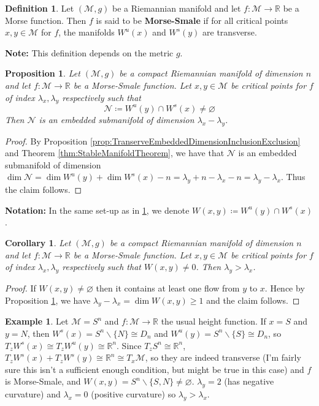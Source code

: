 \documentclass[10pt]{article}
\theoremstyle{plain}
\newtheorem{corollary}[thm]{Corollary}
\newtheorem{prop}[thm]{Proposition}
\theoremstyle{definition}
\newtheorem{defn}[thm]{Definition} %
\newtheorem{exmp}[thm]{Example} %
\newcommand{\Notation}{\textbf{Notation: }}
\newcommand{\Note}{\textbf{Note: }}
\newcommand{\Real}{\mathbb{R}}
\newcommand{\man}{\mathcal{M}}
\newcommand{\nan}{\mathcal{N}}
\begin{document}
\begin{defn}
    Let $(\man,g)$ be a Riemannian manifold and let $f:\man\to\Real$ be a Morse function. Then $f$ is said to be \textbf{Morse-Smale} if for all critical points $x,y\in\man$ for $f$, the manifolds $W^u(x)$ and $W^s(y)$ are transverse.
\end{defn}
\Note This definition depends on the metric $g$.
\begin{prop}\label{prop:IntersectionOfStableUnstableManifoldsDimension}
    Let $(\man,g)$ be a compact Riemannian manifold of dimension $n$ and let $f:\man \to\Real$ be a Morse-Smale function. Let $x,y\in\man$ be critical points for $f$ of index $\lambda_x,\lambda_y$ respectively such that 
        $$\nan \coloneqq W^u(y)\cap W^s(x) \neq \varnothing$$
    Then $\nan$ is an embedded submanifold of dimension $\lambda_x - \lambda_y$.
\end{prop}
\begin{proof}
    By Proposition \ref{prop:TranserveEmbeddedDimensionInclusionExclusion} and Theorem \ref{thm:StableManifoldTheorem}, we have that $\nan$ is an embedded submanifold of dimension $\dim \nan = \dim W^u(y) + \dim W^s(x) - n = \lambda_y + n -\lambda_x - n = \lambda_y - \lambda_x.$ Thus the claim follows.
\end{proof}
\noindent
\Notation In the same set-up as in \ref{prop:IntersectionOfStableUnstableManifoldsDimension}, we denote $W(x,y) \coloneqq W^u(y)\cap W^s(x)$.

\begin{corollary}
    Let $(\man,g)$ be a compact Riemannian manifold of dimension $n$ and let $f:\man\to\Real$ be a Morse-Smale function. Let $x,y\in\man$ be critical points for $f$ of index $\lambda_x,\lambda_y$ respectively such that $W(x,y) \neq 0$. Then $\lambda_y > \lambda_x$.
\end{corollary}
\begin{proof}
    If $W(x,y) \neq \varnothing$ then it contains at least one flow from $y$ to $x$. Hence by Proposition \ref{prop:IntersectionOfStableUnstableManifoldsDimension}, we have $\lambda_y - \lambda_x = \dim W(x,y) \geq 1$ and the claim follows.
\end{proof}
\begin{exmp}
    Let $\man = S^n$ and $f:\man\to\Real$ the usual height function. If $x=S$ and $y = N$, then $W^s(x) = S^n \backslash\{N\} \cong D_n$ and $W^u(y) = S^n \backslash\{S\} \cong D_n$, so $T_zW^s(x) \cong T_zW^u(y) \cong \Real^n$. Since $T_zS^n \cong \Real^n$, $T_zW^s(x) + T_zW^s(y) \cong \Real^n \cong T_x\man$, so they are indeed transverse (I'm fairly sure this isn't a sufficient enough condition, but might be true in this case) and $f$ is Morse-Smale, and $W(x,y) = S^n \backslash\{S,N\} \neq \varnothing$. $\lambda_y = 2$ (has negative curvature) and $\lambda_x = 0 $ (positive curvature) so $\lambda_y > \lambda _x$. 
\end{exmp}
\end{document}

